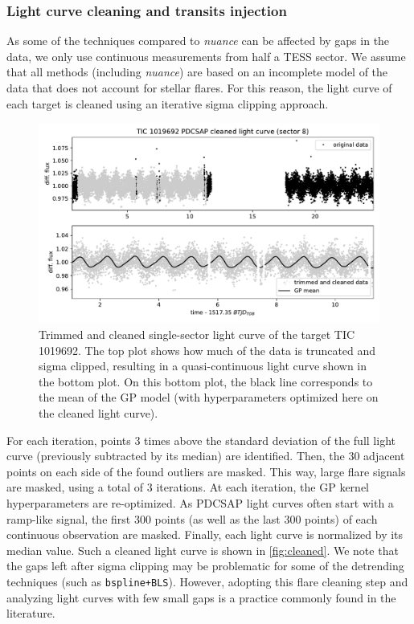 \documentclass[modern,linenumbers]{aastex631}
\newcommand{\nuancemethod}{\textit{nuance}}
\newcommand{\nuance}{\nuancemethod{}}
\begin{document}
\subsubsection*{Light curve cleaning and transits injection}
As some of the techniques compared to \nuance{} can be affected by gaps in the data, we only use continuous measurements from half a TESS sector. We assume that all methods (including \nuance{}) are based on an incomplete model of the data that does not account for stellar flares. For this reason, the light curve of each target is cleaned using an iterative sigma clipping approach.
\begin{figure}[H]
    \centering
    \includegraphics[width=\linewidth]{../workflows/tess_injection_recovery/figures/cleaned/1019692.pdf}
    \caption{Trimmed and cleaned single-sector light curve of the target TIC 1019692. The top plot shows how much of the data is truncated and sigma clipped, resulting in a quasi-continuous light curve shown in the bottom plot. On this bottom plot, the black line corresponds to the mean of the GP model (with hyperparameters optimized here on the cleaned light curve).}
    \label{fig:cleaned}
\end{figure}
For each iteration, points 3 times above the standard deviation of the full light curve (previously subtracted by its median) are identified. Then, the 30 adjacent points on each side of the found outliers are masked. This way, large flare signals are masked, using a total of 3 iterations. At each iteration, the GP kernel hyperparameters are re-optimized. As PDCSAP light curves often start with a ramp-like signal, the first 300 points (as well as the last 300 points) of each continuous observation are masked. Finally, each light curve is normalized by its median value. Such a cleaned light curve is shown in \autoref{fig:cleaned}. We note that the gaps left after sigma clipping may be problematic for some of the detrending techniques (such as \texttt{bspline+BLS}). However, adopting this flare cleaning step and analyzing light curves with few small gaps is a practice commonly found in the literature.\\\\
\end{document}
